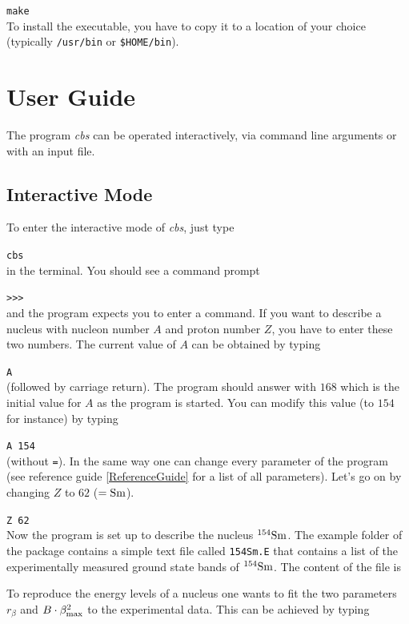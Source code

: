 \documentclass[10pt,a4paper]{article}
\begin{document}
\verb!make! \\
To install the executable, you have to copy it to a location of your choice (typically \verb!/usr/bin! or \verb!$HOME/bin!).

\section{User Guide}
The program \textit{cbs} can be operated interactively, via command line arguments or with an input file.
\subsection{Interactive Mode}
To enter the interactive mode of \textit{cbs}, just type 

\verb!cbs! \\
in the terminal. You should see a command prompt 

\verb!>>>! \\
and the program expects you to enter a command. If you want to describe a nucleus with nucleon number $A$ and proton number $Z$, you have to enter these two numbers. The current value of $A$ can be obtained by typing 

\verb!A! \\
(followed by carriage return). The program should answer with $168$ which is the initial value for $A$ as the program is started. You can modify this value (to $154$ for instance) by typing 

\verb!A 154! \\
(without \verb!=!). In the same way one can change every parameter of the program (see reference guide \ref{ReferenceGuide} for a list of all parameters). Let's go on by changing $Z$ to $62$ ($={\rm Sm}$). 

\verb!Z 62! \\
Now the program is set up to describe the nucleus $^{154}{\rm Sm}$. The example folder of the package contains a simple text file called \verb!154Sm.E! that contains a list of the experimentally measured ground state bands of $^{154}{\rm Sm}$. The content of the file is

 
To reproduce the energy levels of a nucleus one wants to fit the two parameters $r_{\beta}$ and $B\cdot\beta_{\rm max}^2$ to the experimental data. This can be achieved by typing
\end{document}
